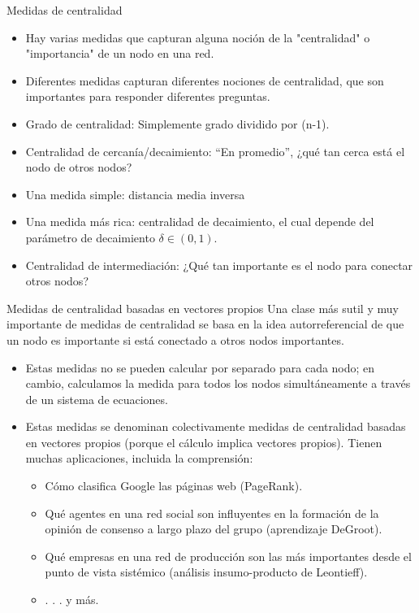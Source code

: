 \documentclass[11pt]{beamer}
\begin{document}
\begin{frame}{Medidas de centralidad}
    \begin{itemize}
        \item Hay varias medidas que capturan alguna noción de la "centralidad" o "importancia" de un nodo en una red.
\item Diferentes medidas capturan diferentes nociones de centralidad, que son importantes para responder diferentes preguntas.
\item Grado de centralidad: Simplemente grado dividido por (n-1).
\item Centralidad de cercanía/decaimiento: “En promedio”, ¿qué tan cerca está el nodo de otros nodos?
\item Una medida simple: distancia media inversa
\item Una medida más rica: centralidad de decaimiento, el cual depende del parámetro de decaimiento 
$\delta \in (0, 1)$.
\item Centralidad de intermediación: ¿Qué tan importante es el nodo para conectar otros nodos?
    \end{itemize}
\end{frame}

\begin{frame}{Medidas de centralidad basadas en vectores propios}
 \small Una clase más sutil y muy importante de medidas de centralidad se basa en la idea autorreferencial de que un nodo es importante si está conectado a otros nodos importantes.   
    \begin{itemize}
\small        \item Estas medidas no se pueden calcular por separado para cada nodo; en cambio, calculamos la medida para todos los nodos simultáneamente a través de un sistema de ecuaciones.
\item Estas medidas se denominan colectivamente medidas de centralidad basadas en vectores propios (porque el cálculo implica vectores propios). Tienen muchas aplicaciones, incluida la comprensión:
\begin{itemize}
\item Cómo clasifica Google las páginas web (PageRank).
\item Qué agentes en una red social son influyentes en la formación de la opinión de consenso a largo plazo del grupo (aprendizaje DeGroot).
\item Qué empresas en una red de producción son las más importantes desde el punto de vista sistémico (análisis insumo-producto de Leontieff).
\item . . . y más.
\end{itemize}
    \end{itemize}
\end{frame}
\end{document}
